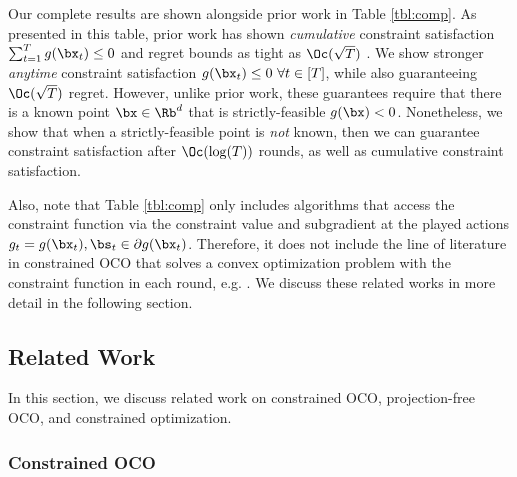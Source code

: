 Our complete results are shown alongside prior work in Table \ref{tbl:comp}.
As presented in this table, prior work has shown \emph{cumulative} constraint satisfaction $\sum_{t=1}^{T} g(\bx_t) \leq 0$ and regret bounds as tight as $\Oc(\sqrt{T})$ \cite{mahdavi2012trading,jenatton2016adaptive,yuan2018online,yu2017online}.
We show stronger \emph{anytime} constraint satisfaction $g(\bx_t) \leq 0\ \forall t \in [T]$, while also guaranteeing $\Oc(\sqrt{T})$ regret.
However, unlike prior work, these guarantees require that there is a known point $\bx \in \Rb^d$ that is strictly-feasible $g(\bx) < 0$.
Nonetheless, we show that when a strictly-feasible point is \emph{not} known, then we can guarantee constraint satisfaction after $\Oc(\log(T))$ rounds, as well as cumulative constraint satisfaction.

Also, note that Table \ref{tbl:comp} only includes algorithms that access the constraint function via the constraint value and subgradient at the played actions $g_t = g(\bx_t), \bs_t \in \partial g(\bx_t)$.
Therefore, it does not include the line of literature in constrained OCO that solves a convex optimization problem with the constraint function in each round, e.g. \cite{yu2020low,yi2021regret,guo2022online}.
We discuss these related works in more detail in the following section.

\subsection{Related Work}
\label{sec:rel_work}

In this section, we discuss related work on constrained OCO, projection-free OCO, and constrained optimization.

\subsubsection{Constrained OCO}

